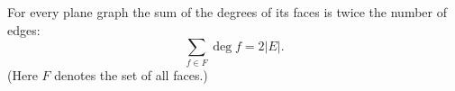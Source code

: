 

\setcounter{section}{3}
\setcounter{subsection}{2}
\setcounter{dfn}{6}

\begin{thm}
\label{thm:DualHandshake}
For every plane graph the sum of the degrees of its faces is twice the number of edges:
\[
\sum_{f \in F} \deg f = 2 |E|.
\]
(Here $F$ denotes the set of all faces.)
\end{thm}

